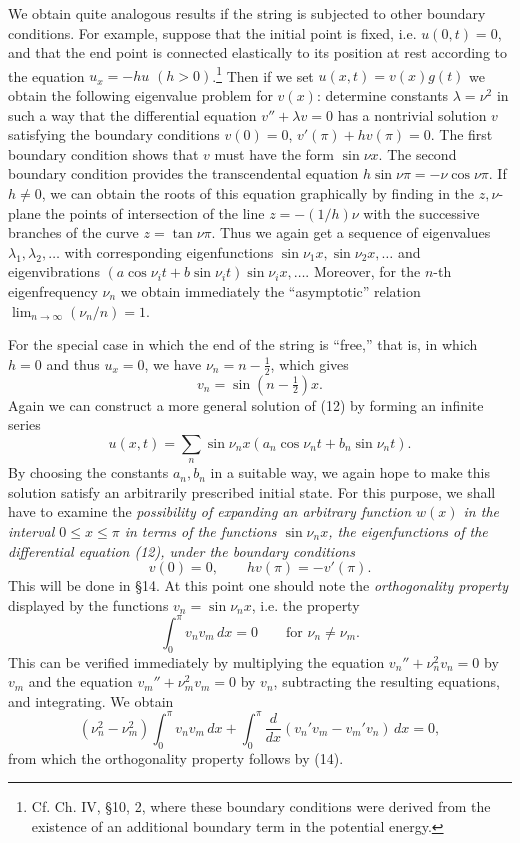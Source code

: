 We obtain quite analogous results if the string is subjected to other boundary conditions. For example, suppose that the initial point is fixed, i.e. $u(0,t)=0$, and that the end point is connected elastically to its position at rest according to the equation $u_x=-hu$ $(h>0)$.\footnote{Cf. Ch. IV, \S10, 2, where these boundary conditions were derived from the existence of an additional boundary term in the potential energy.} Then if we set $u(x,t)=v(x)g(t)$ we obtain the following eigenvalue problem for $v(x)$: determine constants $\lambda=\nu^2$ in such a way that the differential equation $v''+\lambda v=0$ has a nontrivial solution $v$ satisfying the boundary conditions $v(0)=0$, $v'(\pi)+hv(\pi)=0$. The first boundary condition shows that $v$ must have the form $\sin\nu x$. The second boundary condition provides the transcendental equation $h\sin\nu\pi=-\nu\cos\nu\pi$. If $h\ne0$, we can obtain the roots of this equation graphically by finding in the $z,\nu$-plane the points of intersection of the line $z=-(1/h)\nu$ with the successive branches of the curve $z=\tan\nu\pi$. Thus we again get a sequence of eigenvalues $\lambda_1,\lambda_2,\ldots$ with corresponding eigenfunctions $\sin\nu_1x,\sin\nu_2x,\ldots$ and eigenvibrations $(a\cos\nu_it+b\sin\nu_it)\sin\nu_ix,\ldots$. Moreover, for the $n$-th eigenfrequency $\nu_n$ we obtain immediately the ``asymptotic'' relation $\lim_{n\to\infty}(\nu_n/n)=1$.

For the special case in which the end of the string is ``free,'' that is, in which $h=0$ and thus $u_x=0$, we have $\nu_n=n-\tfrac12$, which gives
\[
v_n=\sin\left(n-\tfrac12\right)x.
\]
Again we can construct a more general solution of (12) by forming an infinite series
\[
u(x,t)=\sum_n\sin\nu_nx(a_n\cos\nu_nt+b_n\sin\nu_nt).
\]
By choosing the constants $a_n,b_n$ in a suitable way, we again hope to make this solution satisfy an arbitrarily prescribed initial state. For this purpose, we shall have to examine the \emph{possibility of expanding an arbitrary function $w(x)$ in the interval $0\le x\le\pi$ in terms of the functions $\sin\nu_nx$, the eigenfunctions of the differential equation (12), under the boundary conditions}
\begin{equation}\tag{14}
v(0)=0,\qquad hv(\pi)=-v'(\pi).
\end{equation}
This will be done in \S14. At this point one should note the \emph{orthogonality property} displayed by the functions $v_n=\sin\nu_nx$, i.e. the property
\begin{equation}\tag{15}
\int_0^\pi v_nv_m\,dx=0\qquad\text{for }\nu_n\ne\nu_m.
\end{equation}
This can be verified immediately by multiplying the equation $v_n''+\nu_n^2v_n=0$ by $v_m$ and the equation $v_m''+\nu_m^2v_m=0$ by $v_n$, subtracting the resulting equations, and integrating. We obtain
\[
(\nu_n^2-\nu_m^2)\int_0^\pi v_nv_m\,dx+\int_0^\pi\frac{d}{dx}(v_n'v_m-v_m'v_n)\,dx=0,
\]
from which the orthogonality property follows by (14).

